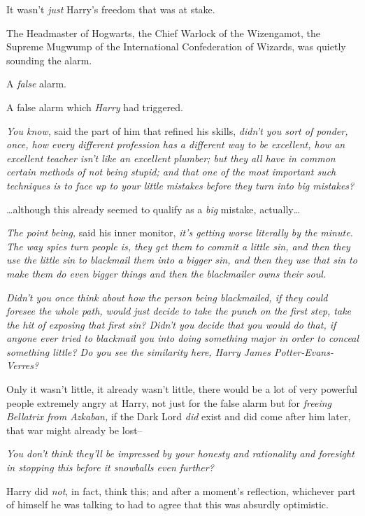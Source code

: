 It wasn't \emph{just} Harry's freedom that was at stake.

The Headmaster of Hogwarts, the Chief Warlock of the Wizengamot, the Supreme Mugwump of the International Confederation of Wizards, was quietly sounding the alarm.

A \emph{false} alarm.

A false alarm which \emph{Harry} had triggered.

\emph{You know,} said the part of him that refined his skills, \emph{didn't you sort of ponder, once, how every different profession has a different way to be excellent, how an excellent teacher isn't like an excellent plumber; but they all have in common certain methods of not being stupid; and that one of the most important such techniques is to face up to your little mistakes before they turn into \emph{big} mistakes?}

{\ldots}although this already seemed to qualify as a \emph{big} mistake, actually{\ldots}

\emph{The point being,} said his inner monitor, \emph{it's getting worse literally by the minute. The way spies turn people is, they get them to commit a little sin, and then they use the little sin to blackmail them into a bigger sin, and then they use \emph{that} sin to make them do even bigger things and then the blackmailer owns their soul.}

\emph{Didn't you once think about how the person being blackmailed, if they could foresee the whole path, would just decide to take the punch on the first step, take the hit of exposing that first sin? Didn't you decide that you would do that, if anyone ever tried to blackmail you into doing something major in order to conceal something little? Do you see the similarity here, Harry James Potter-Evans-Verres?}

Only it wasn't little, it already wasn't little, there would be a lot of very powerful people extremely angry at Harry, not just for the false alarm but for \emph{freeing Bellatrix from Azkaban,} if the Dark Lord \emph{did} exist and did come after him later, that war might already be lost\---

\emph{You don't think they'll be impressed by your honesty and rationality and foresight in stopping this before it snowballs even further?}

Harry did \emph{not}, in fact, think this; and after a moment's reflection, whichever part of himself he was talking to had to agree that this was absurdly optimistic.

